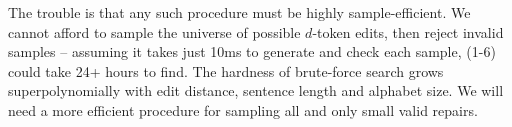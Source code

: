 \documentclass[sigplan,review,acmsmall,nonacm,anonymous]{acmart}\settopmatter{printfolios=false,printccs=false,printacmref=false}
\begin{document}
  The trouble is that any such procedure must be highly sample-efficient. We cannot afford to sample the universe of possible $d$-token edits, then reject invalid samples -- assuming it takes just 10ms to generate and check each sample, (1-6) could take 24+ hours to find. The hardness of brute-force search grows superpolynomially with edit distance, sentence length and alphabet size. We will need a more efficient procedure for sampling all and only small valid repairs.

%
%
%
%
\end{document}
